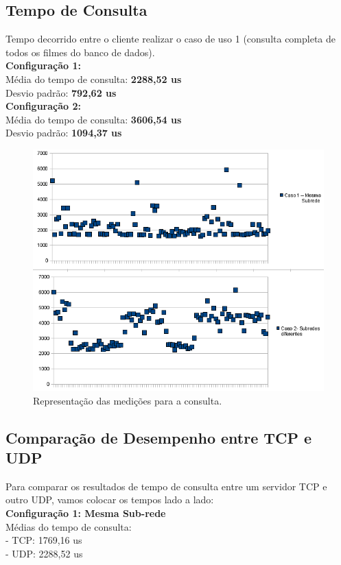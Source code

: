 \documentclass[11pt,twoside]{article}
\begin{document}
\subsection{Tempo de Consulta}
Tempo decorrido entre o cliente realizar o caso de uso 1 (consulta completa de todos os filmes do banco de dados).\\
\textbf{Configuração 1: }\\
Média do tempo de consulta: \textbf{2288,52 us}\\
Desvio padrão: \textbf{792,62 us}\\
\textbf{Configuração 2: }\\
Média do tempo de consulta: \textbf{3606,54 us}\\
Desvio padrão: \textbf{1094,37 us}\\
\begin{figure}[htb]
  \centering
  \includegraphics[width=15cm]{consulta.png} 
  \caption{Representação das medições para a consulta.}
  \label{fig:rtt}
\end{figure}

\subsection{Comparação de Desempenho entre TCP e UDP}
Para comparar os resultados de tempo de consulta entre um servidor TCP e outro UDP, vamos colocar os tempos lado a lado:\\

\textbf{Configuração 1: Mesma Sub-rede}\\
Médias do tempo de consulta:\\
- TCP: 1769,16 us\\
- UDP: 2288,52 us\\
\end{document}
